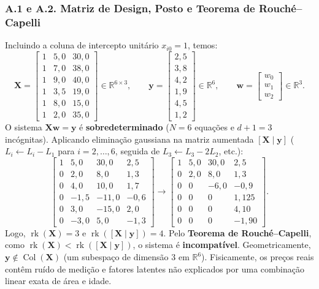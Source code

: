 \documentclass[11pt,a4paper]{article}
\begin{document}
\subsubsection*{A.1 e A.2. Matriz de Design, Posto e Teorema de Rouché--Capelli}
Incluindo a coluna de intercepto unitário $x_{i0} = 1$, temos:
\[
\mathbf{X} = \begin{bmatrix}
1 & 5{,}0 & 30{,}0 \\
1 & 7{,}0 & 38{,}0 \\
1 & 9{,}0 & 40{,}0 \\
1 & 3{,}5 & 19{,}0 \\
1 & 8{,}0 & 15{,}0 \\
1 & 2{,}0 & 35{,}0
\end{bmatrix} \in \mathbb{R}^{6 \times 3}, \qquad
\mathbf{y} = \begin{bmatrix} 2{,}5 \\ 3{,}8 \\ 4{,}2 \\ 1{,}9 \\ 4{,}5 \\ 1{,}2 \end{bmatrix} \in \mathbb{R}^6, \qquad
\mathbf{w} = \begin{bmatrix} w_0 \\ w_1 \\ w_2 \end{bmatrix} \in \mathbb{R}^3.
\]
O sistema $\mathbf{X}\mathbf{w} = \mathbf{y}$ é \textbf{sobredeterminado} ($N=6$ equações e $d+1=3$ incógnitas). Aplicando eliminação gaussiana na matriz aumentada $[\mathbf{X} \mid \mathbf{y}]$ ($L_i \leftarrow L_i - L_1$ para $i=2,\dots,6$, seguida de $L_3 \leftarrow L_3 - 2L_2$, etc.):
\[
\left[\begin{array}{ccc|c}
1 & 5{,}0 & 30{,}0 & 2{,}5 \\
0 & 2{,}0 & 8{,}0 & 1{,}3 \\
0 & 4{,}0 & 10{,}0 & 1{,}7 \\
0 & -1{,}5 & -11{,}0 & -0{,}6 \\
0 & 3{,}0 & -15{,}0 & 2{,}0 \\
0 & -3{,}0 & 5{,}0 & -1{,}3
\end{array}\right]
\longrightarrow
\left[\begin{array}{ccc|c}
1 & 5{,}0 & 30{,}0 & 2{,}5 \\
0 & 2{,}0 & 8{,}0 & 1{,}3 \\
0 & 0 & -6{,}0 & -0{,}9 \\
0 & 0 & 0 & 1{,}125 \\
0 & 0 & 0 & 4{,}10 \\
0 & 0 & 0 & -1{,}90
\end{array}\right].
\]
Logo, $\operatorname{rk}(\mathbf{X}) = 3$ e $\operatorname{rk}([\mathbf{X} \mid \mathbf{y}]) = 4$. Pelo \textbf{Teorema de Rouché--Capelli}, como $\operatorname{rk}(\mathbf{X}) < \operatorname{rk}([\mathbf{X} \mid \mathbf{y}])$, o sistema é \textbf{incompatível}. Geometricamente, $\mathbf{y} \notin \operatorname{Col}(\mathbf{X})$ (um subespaço de dimensão 3 em $\mathbb{R}^6$). Fisicamente, os preços reais contêm ruído de medição e fatores latentes não explicados por uma combinação linear exata de área e idade.
\end{document}
